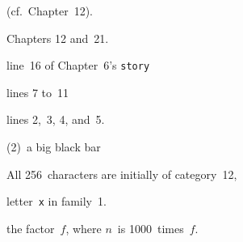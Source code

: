 (cf.~Chapter~12).\par
Chapters 12 and~21.\par
line~16 of Chapter~6's {\tt story}\par
lines 7 to~11\par
lines 2,~3, 4, and~5.\par
(2)~a big black bar\par
All 256~characters are initially of category~12,\par
letter~{\tt x} in family~1.\par
the factor~$f$, where $n$~is 1000~times~$f$.
\bye
